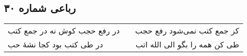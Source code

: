\begin{center}
\section*{رباعی شماره ۳۰}
\label{sec:sh030}
\begin{longtable}{l p{0.5cm} r}
در رفع حجب کوش نه در جمع کتب
&&
کز جمع کتب نمی‌شود رفع حجب
\\
در طی کتب بود کجا نشهٔ حب
&&
طی کن همه را بگو الی الله اتب
\\
\end{longtable}
\end{center}
